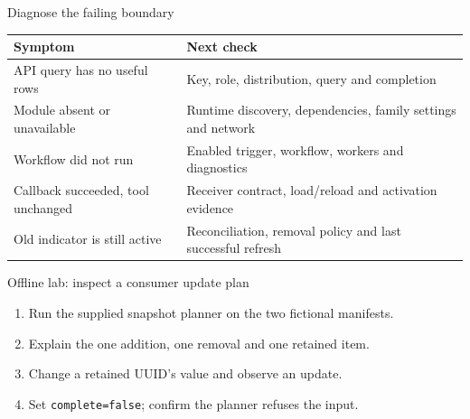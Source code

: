 \begin{frame}{Diagnose the failing boundary}
\small
\begin{tabular}{@{}L{3.35cm}L{6.8cm}@{}}
\textbf{Symptom} & \textbf{Next check} \\ \hline
API query has no useful rows & Key, role, distribution, query and completion \\[.5em]
Module absent or unavailable & Runtime discovery, dependencies, family settings and network \\[.5em]
Workflow did not run & Enabled trigger, workflow, workers and diagnostics \\[.5em]
Callback succeeded, tool unchanged & Receiver contract, load/reload and activation evidence \\[.5em]
Old indicator is still active & Reconciliation, removal policy and last successful refresh
\end{tabular}
\end{frame}

\begin{frame}{Offline lab: inspect a consumer update plan}
\begin{enumerate}
\item Run the supplied snapshot planner on the two fictional manifests.
\item Explain the one addition, one removal and one retained item.
\item Change a retained UUID's value and observe an update.
\item Set \texttt{complete=false}; confirm the planner refuses the input.
\end{enumerate}
\end{frame}

